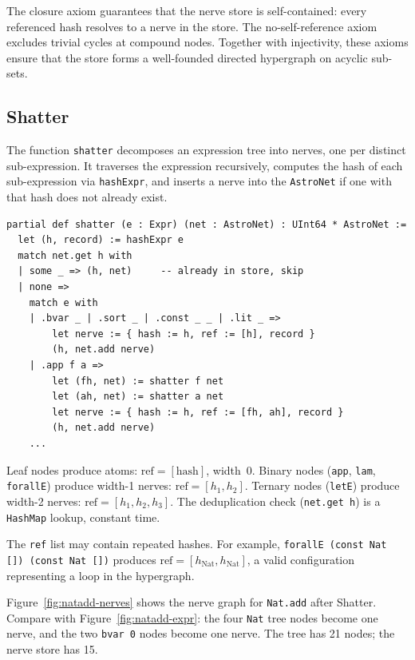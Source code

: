 The closure axiom guarantees that the nerve store is self-contained: every referenced hash resolves to a nerve in the store.  The no-self-reference axiom excludes trivial cycles at compound nodes.  Together with injectivity, these axioms ensure that the store forms a well-founded directed hypergraph on acyclic sub-sets.

\subsection{Shatter}\label{sec:shatter}

The function \texttt{shatter} decomposes an expression tree into nerves, one per distinct sub-expression.  It traverses the expression recursively, computes the hash of each sub-expression via \texttt{hashExpr}, and inserts a nerve into the \texttt{AstroNet} if one with that hash does not already exist.

\begin{lstlisting}[language={},morekeywords={partial,def,match,with,let,some,none}]
partial def shatter (e : Expr) (net : AstroNet) : UInt64 * AstroNet :=
  let (h, record) := hashExpr e
  match net.get h with
  | some _ => (h, net)     -- already in store, skip
  | none =>
    match e with
    | .bvar _ | .sort _ | .const _ _ | .lit _ =>
        let nerve := { hash := h, ref := [h], record }
        (h, net.add nerve)
    | .app f a =>
        let (fh, net) := shatter f net
        let (ah, net) := shatter a net
        let nerve := { hash := h, ref := [fh, ah], record }
        (h, net.add nerve)
    ...
\end{lstlisting}

Leaf nodes produce atoms: $\mathrm{ref} = [\mathrm{hash}]$, width~0.  Binary nodes (\texttt{app}, \texttt{lam}, \texttt{forallE}) produce width-1 nerves: $\mathrm{ref} = [h_1, h_2]$.  Ternary nodes (\texttt{letE}) produce width-2 nerves: $\mathrm{ref} = [h_1, h_2, h_3]$.  The deduplication check (\texttt{net.get h}) is a \texttt{HashMap} lookup, constant time.

The \texttt{ref} list may contain repeated hashes.  For example, \texttt{forallE (const Nat []) (const Nat [])} produces $\mathrm{ref} = [h_{\mathrm{Nat}}, h_{\mathrm{Nat}}]$, a valid configuration representing a loop in the hypergraph.

Figure~\ref{fig:natadd-nerves} shows the nerve graph for \texttt{Nat.add} after Shatter.  Compare with Figure~\ref{fig:natadd-expr}: the four \texttt{Nat} tree nodes become one nerve, and the two \texttt{bvar~0} nodes become one nerve.  The tree has 21 nodes; the nerve store has 15.

